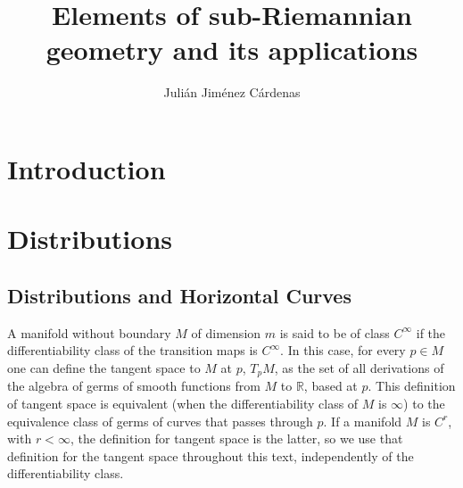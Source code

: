 \documentclass[12pt, letterpaper, reqno]{amsart}
\author{Julián Jiménez Cárdenas}
\title[Elements of sub-Riemannian geometry and its applications]{Elements of sub-Riemannian geometry and its applications}
\theoremstyle{definition}
\theoremstyle{plain}
\theoremstyle{remark}
\begin{document}
\maketitle
\begin{abstract}
\end{abstract}

\section*{Introduction}
\label{sec:0}


\section{Distributions}
\label{sec:1}

\subsection{Distributions and Horizontal Curves}%
\label{sub:distributions}


A manifold without boundary $M$ of dimension $ m $  is said to be of class $ C^\infty $ if the differentiability class of the transition maps is $C^\infty.$ In this case, for every $ p\in M $ one can define the tangent space to $ M $ at $ p $, $ T_p M $, as the set of all derivations of the algebra of germs of smooth functions from $ M $ to $ \mathbb{R}  $,  based at $ p $. This definition of tangent space is equivalent (when the differentiability class of $ M $ is $ \infty $) to the equivalence class of germs of curves that passes through $ p $. If a manifold $ M $  is $C^r$, with $r< \infty$, the definition for tangent space is the latter, so we use that definition for the tangent space throughout this text, independently of the differentiability class.
\end{document}
